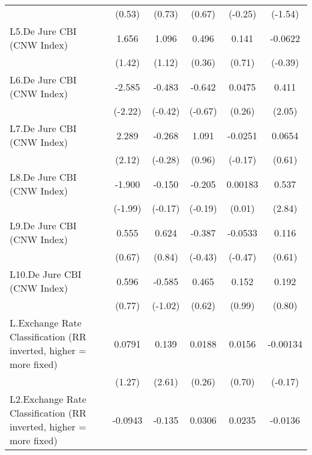 {\begin{tabular}{l*{5}{c}}
                &   (0.53)         &   (0.73)         &   (0.67)         &  (-0.25)         &  (-1.54)         \\
[1em]
L5.De Jure CBI (CNW Index)&    1.656         &    1.096         &    0.496         &    0.141         &  -0.0622         \\
                &   (1.42)         &   (1.12)         &   (0.36)         &   (0.71)         &  (-0.39)         \\
[1em]
L6.De Jure CBI (CNW Index)&   -2.585\sym{*}  &   -0.483         &   -0.642         &   0.0475         &    0.411\sym{*}  \\
                &  (-2.22)         &  (-0.42)         &  (-0.67)         &   (0.26)         &   (2.05)         \\
[1em]
L7.De Jure CBI (CNW Index)&    2.289\sym{*}  &   -0.268         &    1.091         &  -0.0251         &   0.0654         \\
                &   (2.12)         &  (-0.28)         &   (0.96)         &  (-0.17)         &   (0.61)         \\
[1em]
L8.De Jure CBI (CNW Index)&   -1.900\sym{*}  &   -0.150         &   -0.205         &  0.00183         &    0.537\sym{**} \\
                &  (-1.99)         &  (-0.17)         &  (-0.19)         &   (0.01)         &   (2.84)         \\
[1em]
L9.De Jure CBI (CNW Index)&    0.555         &    0.624         &   -0.387         &  -0.0533         &    0.116         \\
                &   (0.67)         &   (0.84)         &  (-0.43)         &  (-0.47)         &   (0.61)         \\
[1em]
L10.De Jure CBI (CNW Index)&    0.596         &   -0.585         &    0.465         &    0.152         &    0.192         \\
                &   (0.77)         &  (-1.02)         &   (0.62)         &   (0.99)         &   (0.80)         \\
[1em]
L.Exchange Rate Classification (RR inverted, higher = more fixed)&   0.0791         &    0.139\sym{*}  &   0.0188         &   0.0156         & -0.00134         \\
                &   (1.27)         &   (2.61)         &   (0.26)         &   (0.70)         &  (-0.17)         \\
[1em]
L2.Exchange Rate Classification (RR inverted, higher = more fixed)&  -0.0943         &   -0.135\sym{**} &   0.0306         &   0.0235         &  -0.0136         \\

\end{tabular}}
